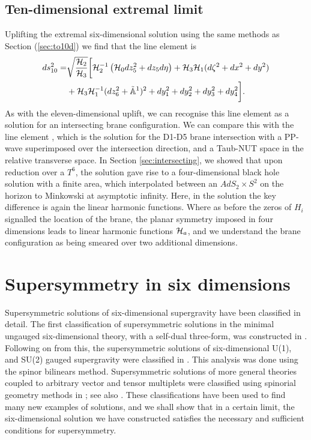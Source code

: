 \subsection*{Ten-dimensional extremal limit}
Uplifting the extremal six-dimensional solution using the same methods as Section (\ref{sec:to10d}) we find that the line element is
\begin{equation}
\label{eq:10extremald1d5}
\begin{aligned}
        ds^2_{10} = &\sqrt{\frac{{\cal H}_2}{{\cal H}_3}} \bigg[{\cal H}_2^{-1} \left({\cal H}_0 dz_5^2 + dz_5d\eta \right) + {\cal H}_3 {\cal H}_1 (d\zeta^2 + dx^2 + dy^2) \\ &+ {\cal H}_3 {\cal H}_1^{-1}(dz_6^2 + \tilde{\mathbb{A}}^1)^2 + dy_1^2 + dy_2^2 + dy_3^2 + dy_4^2\bigg].
\end{aligned}
\end{equation}
As with the eleven-dimensional uplift, we can recognise this line element as a solution for an intersecting brane configuration. We can compare this with the line element , which is the solution for the D1-D5 brane intersection with a PP-wave superimposed over the intersection direction, and a Taub-NUT space in the relative transverse space. In Section \ref{sec:intersecting}, we showed that upon reduction over a $T^6$, the solution  gave rise to a four-dimensional black hole solution with a finite area, which interpolated between an $AdS_2 \times S^2$ on the horizon to Minkowski at asymptotic infinity. Here, in the solution  the key difference is again the linear harmonic functions. Where as before the zeros of $H_i$ signalled the location of the brane, the planar symmetry imposed in four dimensions leads to linear harmonic functions ${\cal H}_a$, and we understand the brane configuration  as being smeared over two additional dimensions.


\section{Supersymmetry in six dimensions}
\label{sec:susy6d}

Supersymmetric solutions of six-dimensional supergravity have been classified in detail. The first classification of supersymmetric solutions in the minimal ungauged six-dimensional theory, with a self-dual three-form, was constructed in \cite{Gutowski:2003rg}. Following on from this, the supersymmetric solutions of six-dimensional U(1), and SU(2) gauged supergravity were classified in \cite{Cariglia:2004kk}. This analysis was done using the spinor bilinears method. Supersymmetric solutions of more general theories coupled to arbitrary vector and tensor multiplets were classified using spinorial geometry methods in \cite{Akyol:2010iz}; see also \cite{Akyol:2012cq, Akyol:2013ana, Cano:2018wnq, Lam:2018jln}. These classifications have been used to find many new examples of solutions, and we shall show that in a certain limit, the six-dimensional solution we have constructed satisfies the necessary and sufficient conditions for supersymmetry.


